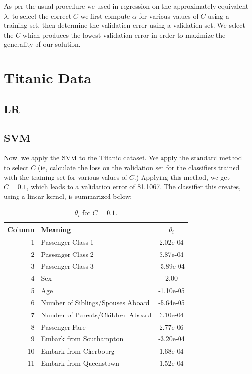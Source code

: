 \documentclass[10pt,letterpaper]{article}
\begin{document}
As per the usual procedure we used in regression on the approximately equivalent $\lambda$, to select the correct $C$ we first compute $\alpha$ for various values of $C$ using a training set, then determine the validation error using a validation set. We select the $C$ which produces the lowest validation error in order to maximize the generality of our solution.
\section{Titanic Data}

\subsection{LR}
\subsection{SVM}
Now, we apply the SVM to the Titanic dataset. We apply the standard method to select $C$ (ie, calculate the loss on the validation set for the classifiers trained with the training set for various values of $C$.) Applying this method, we get $C = 0.1$, which leads to a validation error of 81.1067. The classifier this creates, using a linear kernel, is summarized below:

\begin{table}[!htb]
\centering
\caption{$\theta_i$ for $C = 0.1$.}
\begin{tabular}{rlc}
Column & Meaning                           & $\theta_i$\\ \hline
1      & Passenger Class 1                 & 2.02e-04  \\
2      & Passenger Class 2                 & 3.87e-04  \\
3      & Passenger Class 3                 & -5.89e-04 \\
4      & Sex                               & 2.00      \\
5      & Age                               & -1.10e-05 \\
6      & Number of Siblings/Spouses Aboard & -5.64e-05 \\
7      & Number of Parents/Children Aboard & 3.10e-04  \\
8      & Passenger Fare                    & 2.77e-06  \\
9      & Embark from Southampton           & -3.20e-04 \\
10     & Embark from Cherbourg             & 1.68e-04  \\
11     & Embark from Queenstown            & 1.52e-04  \\
\end{tabular}
\end{table}
\end{document}
